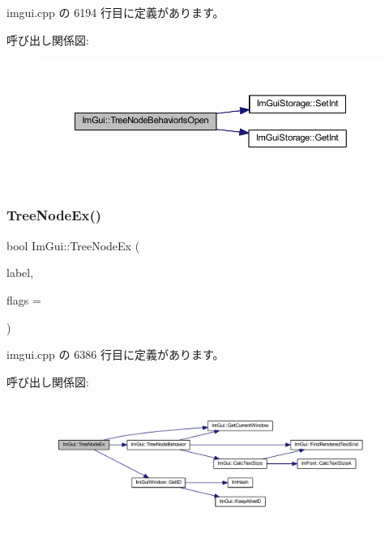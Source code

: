  imgui.\+cpp の 6194 行目に定義があります。

呼び出し関係図\+:\nopagebreak
\begin{figure}[H]
\begin{center}
\leavevmode
\includegraphics[width=350pt]{namespace_im_gui_a22cc50485aad6da8a3a4e156b500ed4a_cgraph}
\end{center}
\end{figure}
\mbox{\label{namespace_im_gui_a21f62e092dac9556a15a8edee2f70522}} 
\subsubsection{\texorpdfstring{Tree\+Node\+Ex()}{TreeNodeEx()}\hspace{0.1cm}{\footnotesize\ttfamily [1/3]}}
{\footnotesize\ttfamily bool Im\+Gui\+::\+Tree\+Node\+Ex (\begin{DoxyParamCaption}\item[{const char $\ast$}]{label,  }\item[{\mbox{\hyperlink{imgui_8h_a0588fdd10c59b49a0159484fe9ec4564}{Im\+Gui\+Tree\+Node\+Flags}}}]{flags = {} }\end{DoxyParamCaption})}



 imgui.\+cpp の 6386 行目に定義があります。

呼び出し関係図\+:\nopagebreak
\begin{figure}[H]
\begin{center}
\leavevmode
\includegraphics[width=350pt]{namespace_im_gui_a21f62e092dac9556a15a8edee2f70522_cgraph}
\end{center}
\end{figure}
\mbox{\label{namespace_im_gui_a9ca2fae922b38cfddc3259f874c18a5d}} 
